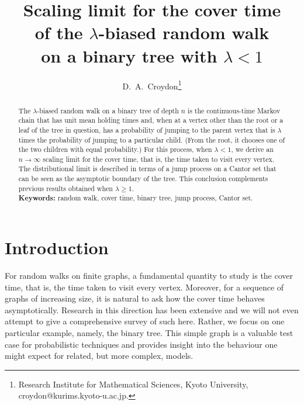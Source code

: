 \documentclass[a4paper, 11pt]{article}
\begin{document}
\title{\vspace{-30pt}Scaling limit for the cover time\\
of the $\lambda$-biased random walk\\
on a binary tree with $\lambda<1$}
\author{D.\ A.\ Croydon\footnote{Research Institute for Mathematical Sciences, Kyoto University, croydon@kurims.kyoto-u.ac.jp.}}

\maketitle

\begin{abstract}
The $\lambda$-biased random walk on a binary tree of depth $n$ is the continuous-time Markov chain that has unit mean holding times and, when at a vertex other than the root or a leaf of the tree in question, has a probability of jumping to the parent vertex that is $\lambda$ times the probability of jumping to a particular child. (From the root, it chooses one of the two children with equal probability.) For this process, when $\lambda<1$, we derive an $n\rightarrow \infty$ scaling limit for the cover time, that is, the time taken to visit every vertex. The distributional limit is described in terms of a jump process on a Cantor set that can be seen as the asymptotic boundary of the tree. This conclusion complements previous results obtained when $\lambda\geq 1$.\\
\textbf{Keywords:} random walk, cover time, binary tree, jump process, Cantor set.
\end{abstract}

\section{Introduction}

For random walks on finite graphs, a fundamental quantity to study is the cover time, that is, the time taken to visit every vertex. Moreover, for a sequence of graphs of increasing size, it is natural to ask how the cover time behaves asymptotically. Research in this direction has been extensive and we will not even attempt to give a comprehensive survey of such here. Rather, we focus on one particular example, namely, the binary tree. This simple graph is a valuable test case for probabilistic techniques and provides insight into the behaviour one might expect for related, but more complex, models.
\end{document}
